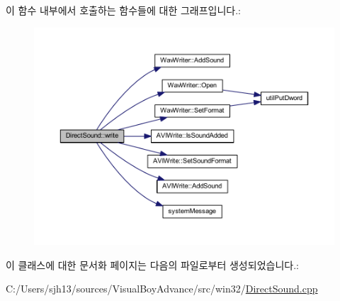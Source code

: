 이 함수 내부에서 호출하는 함수들에 대한 그래프입니다.\+:
\nopagebreak
\begin{figure}[H]
\begin{center}
\leavevmode
\includegraphics[width=350pt]{class_direct_sound_a2e2a78f3a6719920fb2a9dfc48e4b1db_cgraph}
\end{center}
\end{figure}


이 클래스에 대한 문서화 페이지는 다음의 파일로부터 생성되었습니다.\+:\begin{DoxyCompactItemize}
\item 
C\+:/\+Users/sjh13/sources/\+Visual\+Boy\+Advance/src/win32/\mbox{\hyperlink{_direct_sound_8cpp}{Direct\+Sound.\+cpp}}\end{DoxyCompactItemize}
